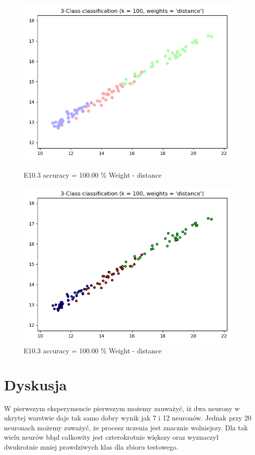 \documentclass{classrep}
\begin{document}
\begin{figure}[H]
\begin{minipage}{0.5\linewidth}
				\includegraphics[scale=0.25]{KNN_seed_10_11.png}
				\caption{E10.3 accuracy = 100.00 \% Weight - distance}
				\label{E10.3}
			\end{minipage}
			\begin{minipage}{0.5\linewidth}
				\centering
				\includegraphics[scale=0.25]{KNN_seed_10_12.png}
				\caption{E10.3 accuracy = 100.00 \% Weight - distance}
				\label{E10.3}
			\end{minipage}
		\end{figure}
		\FloatBarrier
			

\section{Dyskusja}
W pierwszym eksperymencie pierwszym możemy zauważyć, iż dwa neurony w ukrytej warstwie daje tak samo dobry wynik jak 7 i 12 neuronów. Jednak przy 20 neuronach możemy zuważyć, że procesz uczenia jest znacznie wolniejszy. Dla tak wielu neurów błąd całkowity jest czterokrotnie większy oraz wyznaczył dwukrotnie mniej prawdziwych klas dla zbioru testowego.
\end{document}
